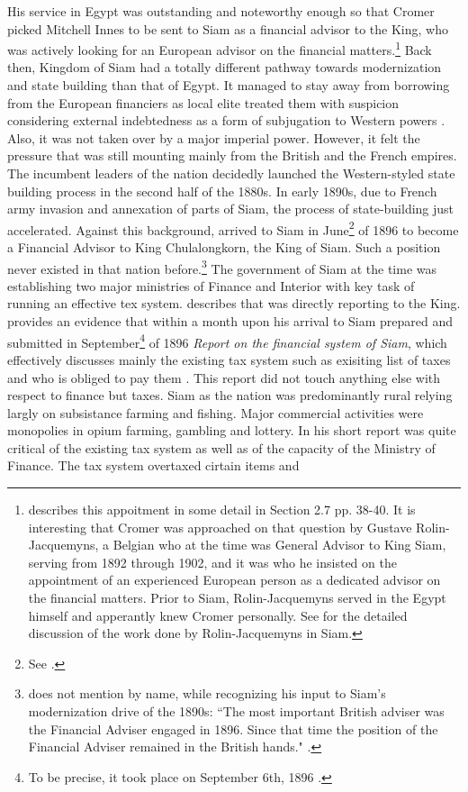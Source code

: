 His service in Egypt was outstanding and noteworthy enough so that Cromer picked Mitchell Innes to be sent to Siam as a financial advisor to the King, who was actively looking for an European advisor on the financial matters.\footnote{\cite{brown1992} describes this appoitment in some detail in Section 2.7 pp. 38-40. It is interesting that Cromer was approached on that question by Gustave Rolin-Jacquemyns, a Belgian who at the time was General Advisor to King Siam, serving from 1892 through 1902, and it was who he insisted on the appointment of an experienced European person as a dedicated advisor on the financial matters. Prior to Siam, Rolin-Jacquemyns served in the Egypt himself and apperantly knew Cromer personally. See \cite{hubert1965} for the detailed discussion of the work done by Rolin-Jacquemyns in Siam.} Back then, Kingdom of Siam had a totally different pathway towards modernization and state building than that of Egypt. It managed to stay away from borrowing from the European financiers as local elite treated them with suspicion considering external indebtedness as a form of subjugation to Western powers \citep[p.~262]{queralt2022}. Also, it was not taken over by a major imperial power. However, it felt the pressure that was still mounting mainly from the British and the French empires. The incumbent leaders of the nation decidedly launched the Western-styled state building process in the second half of the 1880s. In early 1890s, due to French army invasion and annexation of parts of Siam, the process of state-building just accelerated. Against this background, \citeauthor{innes1913} arrived to Siam in June\footnote{See \citep[p.~39]{brown1992}.} of 1896 to become a Financial Advisor to King Chulalongkorn, the King of Siam. Such a position never existed in that nation before.\footnote{\cite{vella1955} does not mention \citeauthor{innes1913} by name, while recognizing his input to Siam's modernization drive of the 1890s: ``The most important British adviser was the Financial Adviser engaged in 1896. Since that time the position of the Financial Adviser remained in the British hands." \citep[p.~343]{vella1955}.} The government of Siam at the time was establishing two major ministries of Finance and Interior with key task of running an effective tex system. \cite{brown1992} describes that \citeauthor{innes1913} was directly reporting to the King. \cite{siam1978} provides an evidence that within a month upon his arrival to Siam \citeauthor{innes1896} prepared and submitted in September\footnote{To be precise, it took place on September 6th, 1896 \citep[p.~375]{innes1896}.} of 1896 \textit{Report on the financial system of Siam}, which effectively discusses mainly the existing tax system such as exisiting list of taxes and who is obliged to pay them \citep{innes1896}. This report did not touch anything else with respect to finance but taxes. Siam as the nation was predominantly rural relying largly on subsistance farming and fishing. Major commercial activities were monopolies in opium farming, gambling and lottery. In his short report \citeauthor{innes1896} was quite critical of the existing tax system as well as of the capacity of the Ministry of Finance. The tax system overtaxed cirtain items and 